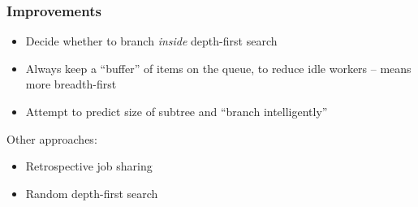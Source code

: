 \documentclass{beamer}
\begin{document}
\begin{frame}
  \frametitle{Improvements}
  \begin{itemize}
  \item Decide whether to branch \textit{inside} depth-first search \pause
  \item Always keep a ``buffer'' of items on the queue, to reduce idle workers -- means more breadth-first \pause
  \item Attempt to predict size of subtree and ``branch intelligently'' \pause
  \end{itemize}

  Other approaches:
  \begin{itemize}
  \item Retrospective job sharing \pause
  \item Random depth-first search
  \end{itemize}
\end{frame}
\end{document}
